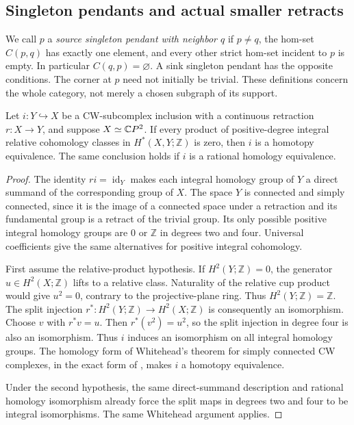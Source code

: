 \subsection{Singleton pendants and actual smaller retracts}

We call $p$ a \emph{source singleton pendant with neighbor $q$}
if $p\ne q$, the hom-set $C(p,q)$ has exactly one element, and
every other strict hom-set incident to $p$ is empty. In particular
$C(q,p)=\varnothing$. A sink singleton pendant has the opposite
conditions. The corner at $p$ need not initially be trivial.
These definitions concern the whole category, not merely a chosen
subgraph of its support.

\begin{lemma}
\label{CP2:A-retract-relative-products}
Let $i:Y\hookrightarrow X$ be a CW-subcomplex inclusion with a
continuous retraction $r:X\to Y$, and suppose $X\simeq\mathbb{C}P^2$.
If every product of positive-degree integral relative cohomology
classes in $H^*(X,Y;\mathbb Z)$ is zero, then $i$ is a homotopy
equivalence. The same conclusion holds if $i$ is a rational
homology equivalence.
\end{lemma}
\begin{proof}
The identity $ri=\operatorname{id}_Y$ makes each integral homology
group of $Y$ a direct summand of the corresponding group of $X$.
The space $Y$ is connected and simply connected, since it is the
image of a connected space under a retraction and its fundamental
group is a retract of the trivial group. Its only possible positive
integral homology groups are $0$ or $\mathbb Z$ in degrees two
and four. Universal coefficients give the same alternatives for
positive integral cohomology.

First assume the relative-product hypothesis. If $H^2(Y;\mathbb Z)=0$,
the generator $u\in H^2(X;\mathbb Z)$ lifts to a relative class.
Naturality of the relative cup product would give $u^2=0$, contrary
to the projective-plane ring. Thus $H^2(Y;\mathbb Z)=\mathbb Z$.
The split injection $r^*:H^2(Y;\mathbb Z)\to H^2(X;\mathbb Z)$
is consequently an isomorphism. Choose $v$ with $r^*v=u$.
Then $r^*(v^2)=u^2$, so the split injection in degree four is
also an isomorphism. Thus $i$ induces an isomorphism on all
integral homology groups. The homology form of Whitehead's
theorem for simply connected CW complexes, in the exact form
of \cite[Corollary~4.33]{CP2-Hatcher2002}, makes $i$ a homotopy
equivalence.

Under the second hypothesis, the same direct-summand description
and rational homology isomorphism already force the split maps
in degrees two and four to be integral isomorphisms. The same
Whitehead argument applies.
\end{proof}

